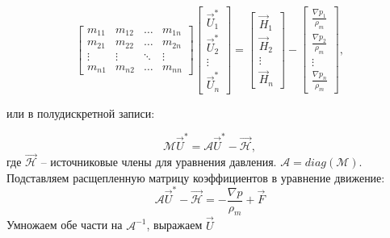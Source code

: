 \begin{equation}
    \left[
        \begin{array}{cccc}
            m_{11} & m_{12} & \ldots & m_{1n}\\[0.055cm]
            m_{21} & m_{22} & \ldots & m_{2n}\\[0.055cm]
            \vdots & \vdots & \ddots & \vdots\\[0.055cm]
            m_{n1} & m_{n2} & \ldots & m_{nn}
        \end{array}
        \right]
        \left[
        \begin{array}{c}
            \vec{U}_{1}^* \\[0.1cm] 
            \vec{U}_{2}^* \\[0.1cm]
            \vdots \\[0.1cm]
            \vec{U}_{n}^*  
        \end{array}
        \right]
        =
        \left[
        \begin{array}{c}
            \vec{H}_{1} \\[0.1cm] 
            \vec{H}_{2} \\[0.1cm]
            \vdots \\[0.1cm]
            \vec{H}_{n}  
        \end{array}
        \right]
        -
        \left[
        \begin{array}{c}
            \frac{\nabla p_1}{\rho_m} \\[0.1cm] 
            \frac{\nabla p_2}{\rho_m} \\[0.1cm]
            \vdots \\[0.1cm]
            \frac{\nabla p_n}{\rho_m}
        \end{array}
        \right],
\end{equation}

или в полудискретной записи:

\begin{equation}
    \mathcal{M} \vec{U}^* = \mathcal{A} \vec{U}^* - \mathcal{\vec{H}},
\end{equation}
где $\mathcal{\vec{H}}$ -- источниковые члены для уравнения давления. $\mathcal{A}=diag(\mathcal{M})$. Подставляем расщепленную матрицу коэффициентов в уравнение движение:
\begin{equation}
    \mathcal{A} \vec{U}^* - \mathcal{\vec{H}}= -\frac{\nabla p}{\rho_m} + \vec{F}    
\end{equation}
Умножаем обе части на $\mathcal{A}^{-1}$, выражаем $\vec U$

